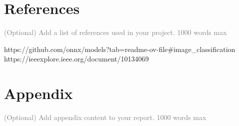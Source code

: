 \documentclass{article}
\begin{document}
\section{References}
\textcolor{gray}{(Optional) Add a list of references used in your project. 1000 words max}




https://github.com/onnx/models?tab=readme-ov-file#image_classification
https://ieeexplore.ieee.org/document/10134069

\section{Appendix}
\textcolor{gray}{(Optional) Add appendix content to your report. 1000 words max}
\end{document}
